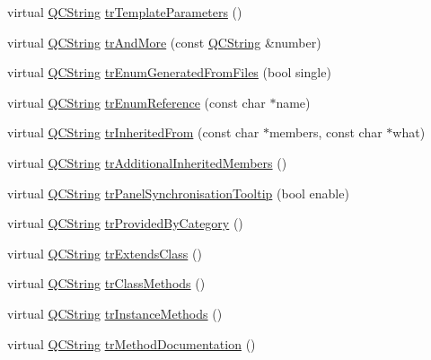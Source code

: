\begin{DoxyCompactItemize}
\item 
virtual \mbox{\hyperlink{class_q_c_string}{Q\+C\+String}} \mbox{\hyperlink{class_translator_hungarian_a2aa583d0e75d803f649480ce817edf88}{tr\+Template\+Parameters}} ()
\item 
virtual \mbox{\hyperlink{class_q_c_string}{Q\+C\+String}} \mbox{\hyperlink{class_translator_hungarian_ab104928ac469feab371dbdb82e2c2c0d}{tr\+And\+More}} (const \mbox{\hyperlink{class_q_c_string}{Q\+C\+String}} \&number)
\item 
virtual \mbox{\hyperlink{class_q_c_string}{Q\+C\+String}} \mbox{\hyperlink{class_translator_hungarian_a515216f8c3ed33b0b55686c579698d33}{tr\+Enum\+Generated\+From\+Files}} (bool single)
\item 
virtual \mbox{\hyperlink{class_q_c_string}{Q\+C\+String}} \mbox{\hyperlink{class_translator_hungarian_ab56f5fb807667927759c33f09bfc38bf}{tr\+Enum\+Reference}} (const char $\ast$name)
\item 
virtual \mbox{\hyperlink{class_q_c_string}{Q\+C\+String}} \mbox{\hyperlink{class_translator_hungarian_a8f2f50bc7e45fb66eef9d200f8f633f4}{tr\+Inherited\+From}} (const char $\ast$members, const char $\ast$what)
\item 
virtual \mbox{\hyperlink{class_q_c_string}{Q\+C\+String}} \mbox{\hyperlink{class_translator_hungarian_a021cab24a5cf78286cd3ed5bd4f7740e}{tr\+Additional\+Inherited\+Members}} ()
\item 
virtual \mbox{\hyperlink{class_q_c_string}{Q\+C\+String}} \mbox{\hyperlink{class_translator_hungarian_af71f673c4752de4d5769332972978a11}{tr\+Panel\+Synchronisation\+Tooltip}} (bool enable)
\item 
virtual \mbox{\hyperlink{class_q_c_string}{Q\+C\+String}} \mbox{\hyperlink{class_translator_hungarian_ac80f2158220d73ded4d6f604d4352a86}{tr\+Provided\+By\+Category}} ()
\item 
virtual \mbox{\hyperlink{class_q_c_string}{Q\+C\+String}} \mbox{\hyperlink{class_translator_hungarian_ab1d0f39b1a3f212429af6d5997e94e3b}{tr\+Extends\+Class}} ()
\item 
virtual \mbox{\hyperlink{class_q_c_string}{Q\+C\+String}} \mbox{\hyperlink{class_translator_hungarian_a6e64d88438d6ec6566175817ba3ecc93}{tr\+Class\+Methods}} ()
\item 
virtual \mbox{\hyperlink{class_q_c_string}{Q\+C\+String}} \mbox{\hyperlink{class_translator_hungarian_aeed59f04bccf097ee35a2111393d2895}{tr\+Instance\+Methods}} ()
\item 
virtual \mbox{\hyperlink{class_q_c_string}{Q\+C\+String}} \mbox{\hyperlink{class_translator_hungarian_a255db686dca6f89cd4405d3ddfafa195}{tr\+Method\+Documentation}} ()

\end{DoxyCompactItemize}
